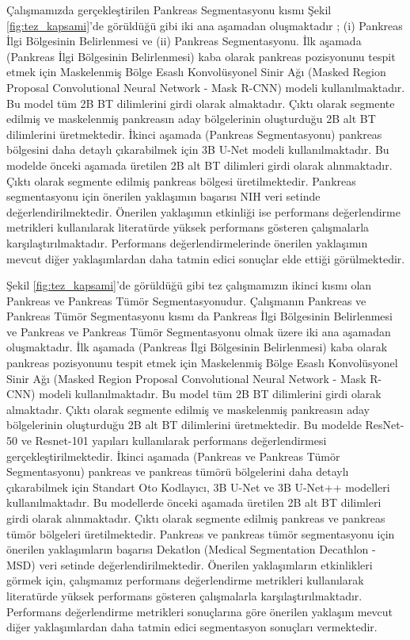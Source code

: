 Çalışmamızda gerçekleştirilen Pankreas Segmentasyonu kısmı Şekil \ref{fig:tez_kapsami}'de görüldüğü gibi iki ana aşamadan oluşmaktadır \cite{dogan2021two}; (i) Pankreas İlgi Bölgesinin Belirlenmesi ve (ii) Pankreas Segmentasyonu. İlk aşamada (Pankreas İlgi Bölgesinin Belirlenmesi) kaba olarak pankreas pozisyonunu tespit etmek için Maskelenmiş Bölge Esaslı Konvolüsyonel Sinir Ağı (Masked Region Proposal Convolutional Neural Network - Mask R-CNN) modeli kullanılmaktadır. Bu model tüm 2B BT dilimlerini girdi olarak almaktadır. Çıktı olarak segmente edilmiş ve maskelenmiş pankreasın aday bölgelerinin oluşturduğu 2B alt BT dilimlerini üretmektedir. İkinci aşamada (Pankreas Segmentasyonu) pankreas bölgesini daha detaylı çıkarabilmek için 3B U-Net modeli kullanılmaktadır. Bu modelde önceki aşamada üretilen 2B alt BT dilimleri girdi olarak alınmaktadır. Çıktı olarak segmente edilmiş pankreas bölgesi üretilmektedir. Pankreas segmentasyonu için önerilen yaklaşımın başarısı NIH veri setinde \cite{roth2015deep} değerlendirilmektedir. Önerilen yaklaşımın etkinliği ise performans değerlendirme metrikleri kullanılarak literatürde yüksek performans gösteren çalışmalarla karşılaştırılmaktadır. Performans değerlendirmelerinde önerilen yaklaşımın mevcut diğer yaklaşımlardan daha tatmin edici sonuçlar elde ettiği görülmektedir. 

Şekil \ref{fig:tez_kapsami}'de görüldüğü gibi tez çalışmamızın ikinci kısmı olan Pankreas ve Pankreas Tümör Segmentasyonudur. Çalışmanın Pankreas ve Pankreas Tümör Segmentasyonu kısmı da Pankreas İlgi Bölgesinin Belirlenmesi ve Pankreas ve Pankreas Tümör Segmentasyonu olmak üzere iki ana aşamadan oluşmaktadır. İlk aşamada (Pankreas İlgi Bölgesinin Belirlenmesi) kaba olarak pankreas pozisyonunu tespit etmek için Maskelenmiş Bölge Esaslı Konvolüsyonel Sinir Ağı (Masked Region Proposal Convolutional Neural Network - Mask R-CNN) modeli kullanılmaktadır. Bu model tüm 2B BT dilimlerini girdi olarak almaktadır. Çıktı olarak segmente edilmiş ve maskelenmiş pankreasın aday bölgelerinin oluşturduğu 2B alt BT dilimlerini üretmektedir. Bu modelde ResNet-50 ve Resnet-101 yapıları kullanılarak performans değerlendirmesi gerçekleştirilmektedir. İkinci aşamada (Pankreas ve Pankreas Tümör Segmentasyonu) pankreas ve pankreas tümörü bölgelerini daha detaylı çıkarabilmek için Standart Oto Kodlayıcı, 3B U-Net ve 3B U-Net++ modelleri kullanılmaktadır. Bu modellerde önceki aşamada üretilen 2B alt BT dilimleri girdi olarak alınmaktadır. Çıktı olarak segmente edilmiş pankreas ve pankreas tümör bölgeleri üretilmektedir. Pankreas ve pankreas tümör segmentasyonu için önerilen yaklaşımların başarısı Dekatlon (Medical Segmentation Decathlon - MSD) veri setinde \cite{simpson2019large} değerlendirilmektedir. Önerilen yaklaşımların etkinlikleri görmek için, çalışmamız performans değerlendirme metrikleri kullanılarak literatürde yüksek performans gösteren çalışmalarla karşılaştırılmaktadır. Performans değerlendirme metrikleri sonuçlarına göre önerilen yaklaşım mevcut diğer yaklaşımlardan daha tatmin edici segmentasyon sonuçları vermektedir. 

